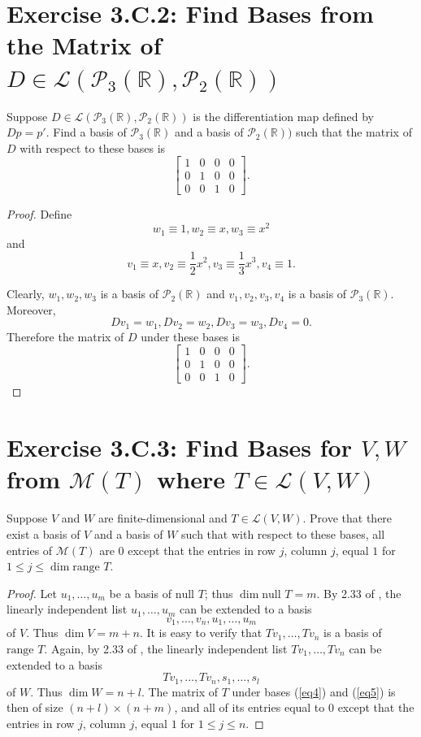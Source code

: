 \section{Exercise 3.C.2: Find Bases from the Matrix of $D\in\mathcal{L}(\mathcal{P}_3(\mathbb{R}),\mathcal{P}_2(\mathbb{R}))$}
Suppose $D\in\mathcal{L}(\mathcal{P}_3(\mathbb{R}),\mathcal{P}_2(\mathbb{R}))$ is the differentiation map defined by $Dp=p'$. Find a basis of $\mathcal{P}_3(\mathbb{R})$ and a basis of $\mathcal{P}_2(\mathbb{R}))$ such that the matrix of $D$ with respect to these bases is\[
\begin{bmatrix}
1&0&0&0\\
0&1&0&0\\
0&0&1&0
\end{bmatrix}.
\]
\begin{proof}
Define\[
w_1\equiv1, w_2\equiv x, w_3\equiv x^2
\]and\[
v_1\equiv x, v_2\equiv\frac{1}{2}x^2, v_3\equiv\frac{1}{3}x^3, v_4\equiv1.
\]

Clearly, $w_1,w_2,w_3$ is a basis of $\mathcal{P}_2(\mathbb{R})$ and $v_1,v_2,v_3,v_4$ is a basis of $\mathcal{P}_3(\mathbb{R})$. Moreover, \[
Dv_1=w_1,Dv_2=w_2,Dv_3=w_3,Dv_4=0.
\]Therefore the matrix of $D$ under these bases is \[
\begin{bmatrix}
1&0&0&0\\
0&1&0&0\\
0&0&1&0
\end{bmatrix}.
\]
\end{proof}
\section{Exercise 3.C.3: Find Bases for $V, W$ from $\mathcal{M}(T)$ where $T\in\mathcal{L}(V,W)$}
Suppose $V$ and $W$ are finite-dimensional and $T\in\mathcal{L}(V,W)$. Prove that there exist a basis of $V$ and a basis of $W$ such that with respect to these bases, all entries of $\mathcal{M}(T)$ are $0$ except that the entries in row $j$, column $j$, equal $1$ for $1\leqslant j\leqslant\dim\text{range }T$.
\begin{proof}
Let $u_1,\dots,u_m$ be a basis of $\text{null }T$; thus $\dim\text{null }T=m$. By 2.33 of \cite{axler2014linear}, the linearly independent list $u_1,\dots,u_m$ can be extended to a basis
\begin{equation}\label{eq4}
v_1,\dots,v_n,u_1,\dots,u_m
\end{equation}
of $V$. Thus $\dim V=m+n$. It is easy to verify that $Tv_1,\dots,Tv_n$ is a basis of $\text{range }T$. Again, by 2.33 of \cite{axler2014linear}, the linearly independent list $Tv_1,\dots,Tv_n$ can be extended to a basis
\begin{equation}\label{eq5}
Tv_1,\dots,Tv_n,s_1,\dots,s_l
\end{equation}
of $W$. Thus $\dim W=n+l$. The matrix of $T$ under bases (\ref{eq4}) and (\ref{eq5}) is then of size $(n+l)\times(n+m)$, and all of its entries equal to $0$ except that the entries in row $j$, column $j$, equal $1$ for $1\leqslant j\leqslant n$.
\end{proof}
